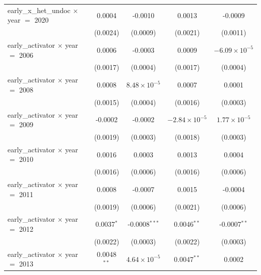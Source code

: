 \begin{tabular}{lcccc}
   early\_x\_het\_undoc $\times$ year $=$ 2020     & 0.0004             & -0.0010                   & 0.0013                 & -0.0009\\   
                                                   & (0.0024)           & (0.0009)                  & (0.0021)               & (0.0011)\\   
   early\_activator $\times$ year $=$ 2006         & 0.0006             & -0.0003                   & 0.0009                 & $-6.09\times 10^{-5}$\\    
                                                   & (0.0017)           & (0.0004)                  & (0.0017)               & (0.0004)\\   
   early\_activator $\times$ year $=$ 2008         & 0.0008             & $8.48\times 10^{-5}$      & 0.0007                 & 0.0001\\   
                                                   & (0.0015)           & (0.0004)                  & (0.0016)               & (0.0003)\\   
   early\_activator $\times$ year $=$ 2009         & -0.0002            & -0.0002                   & $-2.84\times 10^{-5}$  & $1.77\times 10^{-5}$\\    
                                                   & (0.0019)           & (0.0003)                  & (0.0018)               & (0.0003)\\   
   early\_activator $\times$ year $=$ 2010         & 0.0016             & 0.0003                    & 0.0013                 & 0.0004\\   
                                                   & (0.0016)           & (0.0006)                  & (0.0016)               & (0.0006)\\   
   early\_activator $\times$ year $=$ 2011         & 0.0008             & -0.0007                   & 0.0015                 & -0.0004\\   
                                                   & (0.0019)           & (0.0006)                  & (0.0021)               & (0.0006)\\   
   early\_activator $\times$ year $=$ 2012         & 0.0037$^{*}$       & -0.0008$^{***}$           & 0.0046$^{**}$          & -0.0007$^{**}$\\   
                                                   & (0.0022)           & (0.0003)                  & (0.0022)               & (0.0003)\\   
   early\_activator $\times$ year $=$ 2013         & 0.0048$^{**}$      & $4.64\times 10^{-5}$      & 0.0047$^{**}$          & 0.0002\\   

\end{tabular}
